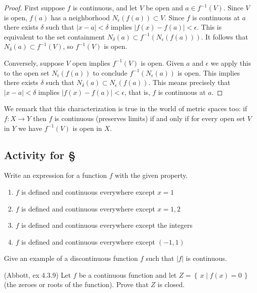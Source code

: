 \documentclass[11pt,oneside]{amsbook}
\newcommand{\set}[1]{\left\{\,#1\,\right\}}
\theoremstyle{definition}
\theoremstyle{plain}
\theoremstyle{definition}
\theoremstyle{remark}
\numberwithin{equation}{section}
\numberwithin{figure}{section}
\newcounter{activityitem}
\newenvironment{activity}{\begin{list}{\arabic{activityitem}.}{\usecounter{activityitem}\setlength{\itemsep}{.2in}}}{\end{list}}
\begin{document}
\begin{proof}
  First suppose $f$ is continuous, and let $V$ be open and $a\in f^{-1}(V)$. Since $V$ is open, $f(a)$ has a neighborhood $N_\epsilon(f(a))\subset V$. Since $f$ is continuous at $a$ there exists $\delta$ such that $|x-a|<\delta$ implies $|f(x)-f(a)|<\epsilon$. This is equivalent to the set containment $N_\delta(a)\subset f^{-1}(N_\epsilon(f(a)))$. It follows that $N_\delta(a)\subset f^{-1}(V)$, so $f^{-1}(V)$ is open.
  
  Conversely, suppose $V$ open implies $f^{-1}(V)$ is open. Given $a$ and $\epsilon$ we apply this to the open set $N_\epsilon(f(a))$ to conclude $f^{-1}(N_\epsilon(a))$ is open. This implies there exists $\delta$ such that $N_\delta(a)\subset N_\epsilon(f(a))$. This means precisely that $|x-a|<\delta$ implies $|f(x)-f(a)|<\epsilon$, that is, $f$ is continuous at $a$.
\end{proof}

We remark that this characterization is true in the world of metric spaces too: if $f\colon X\to Y$ then $f$ is continuous (preserves limits) if and only if for every open set $V$ in $Y$ we have $f^{-1}(V)$ is open in $X$.


\newpage
\subsection*{Activity for \S \thesection}

\begin{activity}
  \item Write an expression for a function $f$ with the given property.
  \begin{enumerate}
    \item $f$ is defined and continuous everywhere except $x=1$
    \item $f$ is defined and continuous everywhere except $x=1,2$
    \item $f$ is defined and continuous everywhere except the integers
    \item $f$ is defined and continuous everywhere except $(-1,1)$
  \end{enumerate}
  \item Give an example of a discontinuous function $f$ such that $|f|$ is continuous.
  \item (Abbott, ex 4.3.9) Let $f$ be a continuous function and let $Z=\set{x\mid f(x)=0}$ (the zeroes or roots of the function). Prove that $Z$ is closed.
\end{activity}
  
\end{document}
